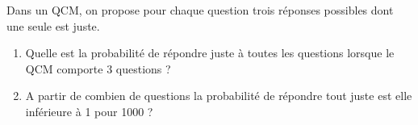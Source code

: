 
Dans un QCM, on propose pour chaque question trois réponses possibles dont une seule est juste.
\begin{enumerate}
\item Quelle est la probabilité de répondre juste à toutes les questions lorsque le QCM comporte 3 questions  ?
\item A partir de combien de questions la probabilité de répondre tout juste est elle inférieure à 1 pour 1000 ?
\end{enumerate}